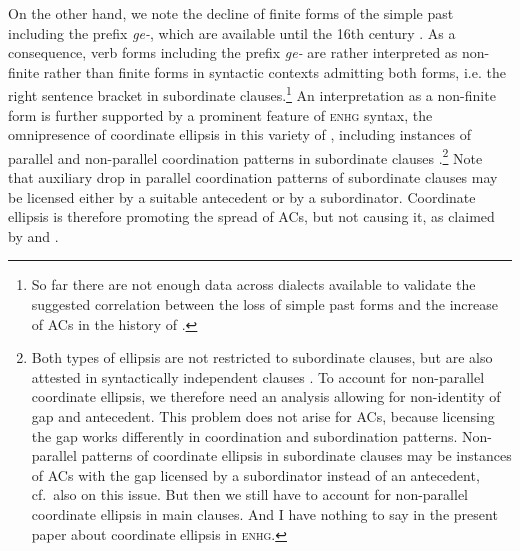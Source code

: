 \documentclass[output=paper,colorlinks,citecolor=brown]{langscibook}
\begin{document}
\noindent
On the other hand, we note the decline of finite forms of the simple past including the prefix \textit{ge-}, which are available until the 16th century \citep[386]{ERSW93}. As a consequence, verb forms including the prefix \textit{ge-} are rather interpreted as non-finite rather than finite forms in syntactic contexts admitting both forms, i.e. the right sentence bracket in subordinate clauses.\footnote{So far there are not enough data across dialects available to validate the suggested correlation between the loss of simple past forms and the increase of ACs in the history of .} An interpretation as a non-finite form is further supported by a prominent feature of \textsc{enhg} syntax, the omnipresence of coordinate ellipsis in this variety of , including instances of parallel and non-parallel coordination patterns in subordinate clauses \citep{behaghel28,schroeder85}.\footnote{Both types of ellipsis are not restricted to subordinate clauses, but are also attested in syntactically independent clauses \citep{biener25}. To account for non-parallel coordinate ellipsis, we therefore need an analysis allowing for non-identity of gap and antecedent. This problem does not arise for ACs, because licensing the gap works differently in coordination and subordination patterns. Non-parallel patterns of coordinate ellipsis in subordinate clauses may be instances of ACs with the gap licensed by a subordinator instead of an antecedent, cf.\ also \citet[63]{breitbarth2005} on this issue. But then we still have to account for non-parallel coordinate ellipsis in main clauses. And I have nothing to say in the present paper about coordinate ellipsis in \textsc{enhg}.} Note that auxiliary drop in parallel coordination patterns of subordinate clauses may be licensed either by a suitable antecedent or by a subordinator. Coordinate ellipsis is therefore promoting the spread of ACs, but not causing it, as claimed by \citet{behaghel28} and \citet{schroeder85}. 
\end{document}
